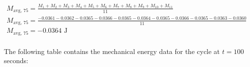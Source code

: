\documentclass{article}
\begin{document}
            \begin{equation}
                \begin{aligned}
                    M_{\text{avg, 75}} &= \frac{M_1 + M_2 + M_3 + M_4 + M_5 + M_6 + M_7 + M_8 + M_9 + M_{10} + M_{11}}{11} \\
                    M_{\text{avg, 75}} &= \frac{-0.0361 -0.0362 -0.0365 -0.0366 -0.0365 -0.0364 -0.0365 -0.0366 -0.0365 -0.0363 -0.0360}{11} \\
                    M_{\text{avg, 75}} &= -0.0364 \text{ J} \\
                \end{aligned}\label{eq:average-mechanical-energy-cycle-at-75-seconds}
            \end{equation}
            
            The following table contains the mechanical energy data for the cycle at $t=100$ seconds:
            
\end{document}
